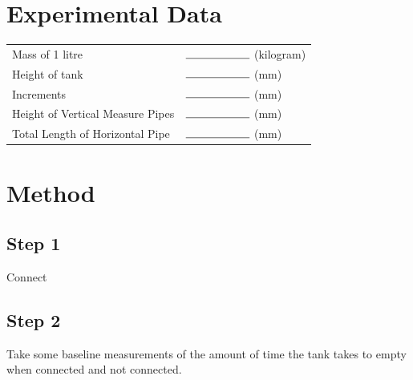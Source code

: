 \documentclass{article}
\begin{document}
%





\section{Experimental Data}

\begin{tabular}{ll}
  Mass of 1 litre & $\rule{2cm}{0.15mm}$ (kilogram)\\
  Height of tank & $\rule{2cm}{0.15mm}$ (mm)\\
  Increments & $\rule{2cm}{0.15mm}$ (mm)\\
  Height of Vertical Measure Pipes & $\rule{2cm}{0.15mm}$  (mm)\\
  Total Length of Horizontal Pipe & $\rule{2cm}{0.15mm}$ (mm)\\
\end{tabular}


\section{Method}

\subsection{Step 1}

Connect

\subsection{Step 2}

Take some baseline measurements of the amount of time the tank takes to empty when connected and not connected.
\end{document}
